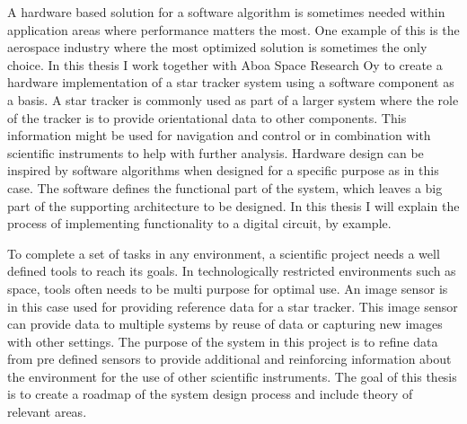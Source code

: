 \documentclass[12pt]{report}
\begin{document}
A hardware based solution for a software algorithm is sometimes needed within application areas where performance matters the most. One example of this is the aerospace industry where the most optimized solution is sometimes the only choice. In this thesis I work together with Aboa Space Research Oy to create a hardware implementation of a star tracker system using a software component as a basis. A star tracker is commonly used as part of a larger system where the role of the tracker is to provide orientational data to other components. This information might be used for navigation and control or in combination with scientific instruments to help with further analysis.
Hardware design can be inspired by software algorithms when designed for a specific purpose as in this case. The software defines the functional part of the system, which leaves a big part of the supporting architecture to be designed. In this thesis I will explain the process of implementing functionality to a digital circuit, by example.



\par

To complete a set of tasks in any environment, a scientific project needs a well defined tools to reach its goals. In technologically restricted environments such as space, tools often needs to be multi purpose for optimal use. An image sensor is in this case used for providing reference data for a star tracker. This image sensor can provide data to multiple systems by reuse of data or capturing new images with other settings. The purpose of the system in this project is to refine data from pre defined sensors to provide additional and reinforcing information about the environment for the use of other scientific instruments. The goal of this thesis is to create a roadmap of the system design process and include theory of relevant areas.
\end{document}
